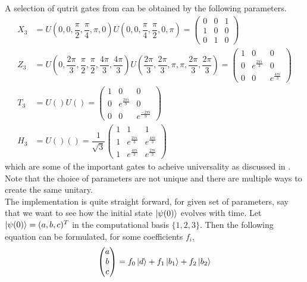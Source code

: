 A selection of qutrit gates from \cite{qudit} can be obtained by the following parameters.\\
\begin{equation}
\begin{aligned}
X_3 &= U(0,0,\dfrac{\pi}{2},\dfrac{\pi}{4},\pi,0)U(0,0,\dfrac{\pi}{4},\dfrac{\pi}{2},0,\pi) 
= \begin{pmatrix}
0&0&1
\\
1&0&0
\\
0&1&0
\end{pmatrix}
\\ 
Z_3 &= U(0,\dfrac{2\pi}{3},\dfrac{\pi}{2},\dfrac{\pi}{2},\dfrac{4\pi}{3},\dfrac{4\pi}{3})U(\dfrac{2\pi}{3},\dfrac{2\pi}{3},\pi,\pi,\dfrac{2\pi}{3},\dfrac{2\pi}{3})
= \begin{pmatrix}
1&0&0
\\
0&e^{\frac{2\pi i}{3}}&0
\\
0&0&e^{\frac{4\pi i}{3}}
\end{pmatrix}
\\
T_3 &=U()U() 
= \begin{pmatrix}
1&0&0
\\
0&e^{\frac{2\pi i}{9}}&0
\\
0&0&e^{\frac{-2\pi i}{9}}
\end{pmatrix}
\\
H_3 &= U()() 
= \dfrac{1}{\sqrt{3}}\begin{pmatrix}
1&1&1
\\
1&e^{\frac{2\pi i}{3}}&e^{\frac{4\pi i}{3}}
\\
1&e^{\frac{4\pi i}{3}}&e^{\frac{2\pi i}{3}}
\end{pmatrix}
\end{aligned}
\end{equation}
which are some of the important gates to acheive universality\cite{qudit} as discussed in . Note that the choice of parameters are not unique and there are multiple ways to create the same unitary.
\\
The implementation is quite straight forward, for given set of parameters, say that we want to see how the initial state $\ket{\psi(0)}$ evolves with time.
Let $\ket{\psi(0)} = (a,b,c)^T$ in the computational basis $\{1,2,3\}$. Then the following equation can be formulated, for some coefficients $f_i$,
\begin{equation}
\begin{pmatrix}
a\\
b\\
c
\end{pmatrix}
= f_0 \ket{d} + f_1\ket{b_1} + f_2\ket{b_2}
\end{equation}
